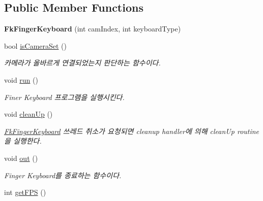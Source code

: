 \subsection*{Public Member Functions}
\begin{DoxyCompactItemize}
\item 
\hypertarget{class_fk_finger_keyboard_af874e6f3dd51282e5dccc2eb0c038414}{}{\bfseries Fk\+Finger\+Keyboard} (int cam\+Index, int keyboard\+Type)\label{class_fk_finger_keyboard_af874e6f3dd51282e5dccc2eb0c038414}

\item 
\hypertarget{class_fk_finger_keyboard_a87804536f6fabceac9d32379a5bc4d98}{}bool \hyperlink{class_fk_finger_keyboard_a87804536f6fabceac9d32379a5bc4d98}{is\+Camera\+Set} ()\label{class_fk_finger_keyboard_a87804536f6fabceac9d32379a5bc4d98}

\begin{DoxyCompactList}\small\item\em 카메라가 올바르게 연결되었는지 판단하는 함수이다. \end{DoxyCompactList}\item 
\hypertarget{class_fk_finger_keyboard_aeabcd0608ad5bad62d9b4d2bb35da40c}{}void \hyperlink{class_fk_finger_keyboard_aeabcd0608ad5bad62d9b4d2bb35da40c}{run} ()\label{class_fk_finger_keyboard_aeabcd0608ad5bad62d9b4d2bb35da40c}

\begin{DoxyCompactList}\small\item\em Finer Keyboard 프로그램을 실행시킨다. \end{DoxyCompactList}\item 
\hypertarget{class_fk_finger_keyboard_a9a3e7939a2a18285d3203019fe7abef6}{}void \hyperlink{class_fk_finger_keyboard_a9a3e7939a2a18285d3203019fe7abef6}{clean\+Up} ()\label{class_fk_finger_keyboard_a9a3e7939a2a18285d3203019fe7abef6}

\begin{DoxyCompactList}\small\item\em \hyperlink{class_fk_finger_keyboard}{Fk\+Finger\+Keyboard} 쓰레드 취소가 요청되면 cleanup handler에 의해 clean\+Up routine을 실행한다. \end{DoxyCompactList}\item 
\hypertarget{class_fk_finger_keyboard_a6e7e7427fc6d26e1f913afe687acf6cb}{}void \hyperlink{class_fk_finger_keyboard_a6e7e7427fc6d26e1f913afe687acf6cb}{out} ()\label{class_fk_finger_keyboard_a6e7e7427fc6d26e1f913afe687acf6cb}

\begin{DoxyCompactList}\small\item\em Finger Keyboard를 종료하는 함수이다. \end{DoxyCompactList}\item 
\hypertarget{class_fk_finger_keyboard_a4db64b06c94dce4352905b1a10acfef4}{}int \hyperlink{class_fk_finger_keyboard_a4db64b06c94dce4352905b1a10acfef4}{get\+F\+P\+S} ()\label{class_fk_finger_keyboard_a4db64b06c94dce4352905b1a10acfef4}


\end{DoxyCompactItemize}
